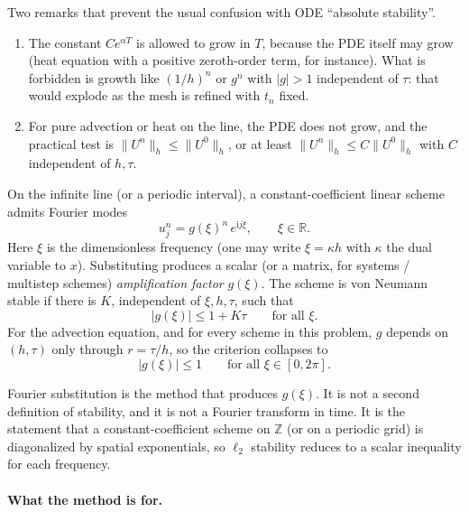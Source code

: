 \documentclass[11pt,a4paper]{article}
\begin{document}
Two remarks that prevent the usual confusion with ODE ``absolute stability''.

\begin{enumerate}[label=\textup{(\roman*)}]
    \item The constant \(C e^{\alpha T}\) is allowed to grow in \(T\), because the PDE itself may grow (heat equation with a positive zeroth-order term, for instance). What is forbidden is growth like \((1/h)^n\) or \(g^n\) with \(|g|>1\) independent of \(\tau\): that would explode as the mesh is refined with \(t_n\) fixed.
    \item For pure advection or heat on the line, the PDE does not grow, and the practical test is \(\|U^n\|_h\le\|U^0\|_h\), or at least \(\|U^n\|_h\le C\|U^0\|_h\) with \(C\) independent of \(h,\tau\).
\end{enumerate}

\begin{definition}
\label{def:von-neumann}
On the infinite line (or a periodic interval), a constant-coefficient linear scheme admits Fourier modes
\[
u_j^n
=
g(\xi)^n\,e^{\mathrm i j\xi},
\qquad
\xi\in\mathbb R.
\]
Here \(\xi\) is the dimensionless frequency (one may write \(\xi=\kappa h\) with \(\kappa\) the dual variable to \(x\)). Substituting produces a scalar (or a matrix, for systems / multistep schemes) \emph{amplification factor} \(g(\xi)\). The scheme is von Neumann stable if there is \(K\), independent of \(\xi,h,\tau\), such that
\[
\bigl|g(\xi)\bigr|
\le
1+K\tau
\qquad
\text{for all }\xi.
\]
For the advection equation, and for every scheme in this problem, \(g\) depends on \((h,\tau)\) only through \(r=\tau/h\), so the criterion collapses to
\[
\bigl|g(\xi)\bigr|\le 1
\qquad
\text{for all }\xi\in[0,2\pi].
\]
\end{definition}

Fourier substitution is the method that produces \(g(\xi)\). It is not a second definition of stability, and it is not a Fourier transform in time. It is the statement that a constant-coefficient scheme on \(\mathbb Z\) (or on a periodic grid) is diagonalized by spatial exponentials, so \(\ell_2\) stability reduces to a scalar inequality for each frequency.

\paragraph{What the method is for.}
\end{document}
